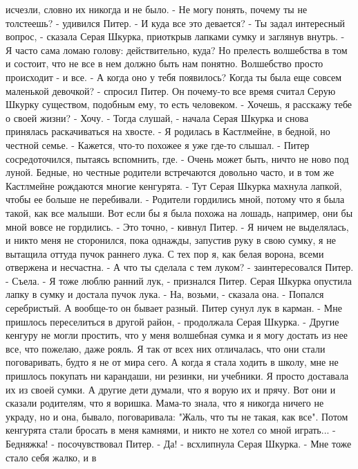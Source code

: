 исчезли, словно их никогда и не было.
    - Не могу понять, почему ты не толстеешь? - удивился Питер. - И 
куда все это девается?
    - Ты задал интересный вопрос, - сказала Серая Шкурка, приоткрыв 
лапками сумку и заглянув внутрь. - Я часто сама ломаю голову: 
действительно, куда? Но прелесть волшебства в том и состоит, что не 
все в нем должно быть нам понятно. Волшебство просто происходит - и 
все.
    - А когда оно у тебя появилось? Когда ты была еще совсем маленькой 
девочкой? - спросил Питер. Он почему-то все время считал Серую Шкурку 
существом, подобным ему, то есть человеком.
    - Хочешь, я расскажу тебе о своей жизни?
    - Хочу.
    - Тогда слушай, - начала Серая Шкурка и снова принялась 
раскачиваться на хвосте. - Я родилась в Кастлмейне, в бедной, но 
честной семье.
    - Кажется, что-то похожее я уже где-то слышал. - Питер 
сосредоточился, пытаясь вспомнить, где.
    - Очень может быть, ничто не ново под луной. Бедные, но честные 
родители встречаются довольно часто, и в том же Кастлмейне рождаются 
многие кенгурята. - Тут Серая Шкурка махнула лапкой, чтобы ее больше 
не перебивали.
    - Родители гордились мной, потому что я была такой, как все 
малыши. Вот если бы я была похожа на лошадь, например, они бы мной 
вовсе не гордились.
    - Это точно, - кивнул Питер.
    - Я ничем не выделялась, и никто меня не сторонился, пока однажды, 
запустив руку в свою сумку, я не вытащила оттуда пучок раннего лука. С 
тех пор я, как белая ворона, всеми отвержена и несчастна.
    - А что ты сделала с тем луком? - заинтересовался Питер.
    - Съела.
    - Я тоже люблю ранний лук, - признался Питер.
    Серая Шкурка опустила лапку в сумку и достала пучок лука.
    - На, возьми, - сказала она. - Попался серебристый. А вообще-то он 
бывает разный.
    Питер сунул лук в карман.
    - Мне пришлось переселиться в другой район, - продолжала Серая 
Шкурка. - Другие кенгуру не могли простить, что у меня волшебная сумка 
и я могу достать из нее все, что пожелаю, даже рояль. Я так от всех 
них отличалась, что они стали поговаривать, будто я не от мира сего. А 
когда я стала ходить в школу, мне не пришлось покупать ни карандаши, 
ни резинки, ни учебники. Я просто доставала их из своей сумки. А 
другие дети думали, что я ворую их и прячу. Вот они и сказали 
родителям, что я воришка. Мама-то знала, что я никогда ничего не 
украду, но и она, бывало, поговаривала: "Жаль, что ты не такая, как 
все". Потом кенгурята стали бросать в меня камнями, и никто не хотел 
со мной играть...
    - Бедняжка! - посочувствовал Питер.
    - Да! - всхлипнула Серая Шкурка. - Мне тоже стало себя жалко, и в 
